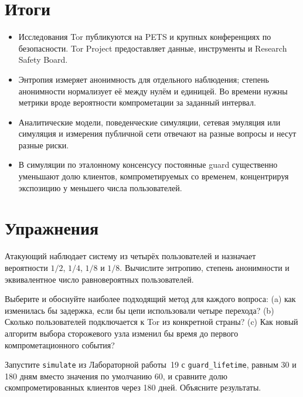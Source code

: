 \section*{Итоги}
\begin{itemize}
  \item Исследования Tor публикуются на PETS и крупных конференциях по безопасности. Tor Project предоставляет данные, инструменты и Research Safety Board.
  \item Энтропия измеряет анонимность для отдельного наблюдения; степень анонимности нормализует её между нулём и единицей. Во времени нужны метрики вроде вероятности компрометации за заданный интервал.
  \item Аналитические модели, поведенческие симуляции, сетевая эмуляция или симуляция и измерения публичной сети отвечают на разные вопросы и несут разные риски.
  \item В симуляции по эталонному консенсусу постоянные guard существенно уменьшают долю клиентов, компрометируемых со временем, концентрируя экспозицию у меньшего числа пользователей.
\end{itemize}

\section*{Упражнения}

\begin{esercizio}[1]\label{es:29-entropia}
Атакующий наблюдает систему из четырёх пользователей и назначает вероятности $1/2$, $1/4$, $1/8$ и $1/8$. Вычислите энтропию, степень анонимности и эквивалентное число равновероятных пользователей.
\end{esercizio}

\begin{esercizio}[1]\label{es:29-metodo}
Выберите и обоснуйте наиболее подходящий метод для каждого вопроса: (a) как изменилась бы задержка, если бы цепи использовали четыре перехода? (b) Сколько пользователей подключается к Tor из конкретной страны? (c) Как новый алгоритм выбора сторожевого узла изменил бы время до первого компрометационного события?
\end{esercizio}

\begin{esercizio}[2]\label{es:29-durata}
Запустите \texttt{simulate} из Лабораторной работы~19 с \texttt{guard\_lifetime}, равным 30 и 180 дням вместо значения по умолчанию 60, и сравните долю скомпрометированных клиентов через 180 дней. Объясните результаты.
\end{esercizio}

